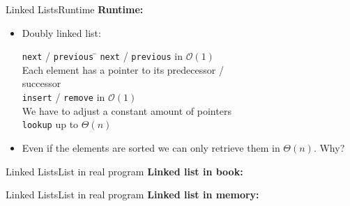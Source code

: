 \begin{frame}{Linked Lists}{Runtime}
  \textbf{Runtime:}
  \begin{itemize}
    \item
      Doubly linked list:
      \begin{tabbing}
        {\color{Mittel-Blau}\texttt{next}} /
        {\color{Mittel-Blau}\texttt{previous}} \=\kill
        {\color{Mittel-Blau}\texttt{next}} /
        {\color{Mittel-Blau}\texttt{previous}}\>
        in $\mathcal{O}(1)$\\
        \hspace{1.5em}Each element has a pointer to its predecessor /\\
        \hspace{1.5em}successor\\[0.5em]
        {\color{Mittel-Blau}\texttt{insert}} /
        {\color{Mittel-Blau}\texttt{remove}} \>
        in $\mathcal{O}(1)$\\
        \hspace{1.5em}We have to adjust a constant amount of pointers\\[0.5em]
        {\color{Mittel-Blau}\texttt{lookup}} \>
        up to $\Theta(n)$
      \end{tabbing}
    \item
      Even if the elements are sorted we can only retrieve them in $\Theta(n)$.
      Why?
  \end{itemize}
\end{frame}


\begin{frame}{Linked Lists}{List in real program}
  \textbf{Linked list in book:}
  \vspace{-1.5em}
  \begin{flushleft}
    
  \end{flushleft}
\end{frame}


\begin{frame}{Linked Lists}{List in real program}
  \textbf{Linked list in memory:}
  \vspace{-1.5em}
  \begin{flushleft}
    
  \end{flushleft}
\end{frame}